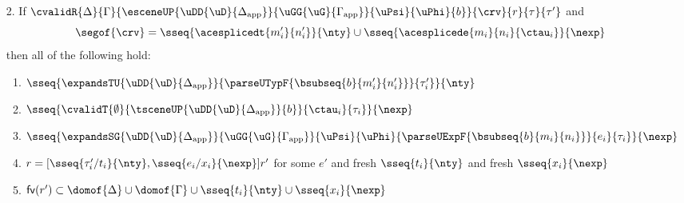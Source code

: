 \begin{lemma}
\begin{grayparbox}
\begin{enumerate}
\item[2.] If $\cvalidR{\Delta}{\Gamma}{\esceneUP{\uDD{\uD}{\Delta_\text{app}}}{\uGG{\uG}{\Gamma_\text{app}}}{\uPsi}{\uPhi}{b}}{\crv}{r}{\tau}{\tau'}$ and \[\segof{\crv} = \sseq{\acesplicedt{m'_i}{n'_i}}{\nty} \cup \sseq{\acesplicede{m_i}{n_i}{\ctau_i}}{\nexp}\] then all of the following hold:
  \begin{enumerate}
    \item $\sseq{
          \expandsTU{\uDD{\uD}{\Delta_\text{app}}}
          {
            \parseUTypF{\bsubseq{b}{m'_i}{n'_i}}
          }{\tau'_i}
        }{\nty}$
    \item $\sseq{
      \cvalidT{\emptyset}{
        \tsceneUP
          {\uDD
            {\uD}{\Delta_\text{app}}
          }{b}
      }{
        \ctau_i
      }{\tau_i}
    }{\nexp}$
    \item $\sseq{
      \expandsSG
        {\uDD{\uD}{\Delta_\text{app}}}
        {\uGG{\uG}{\Gamma_\text{app}}}
        {\uPsi}
        {\uPhi}
        {\parseUExpF{\bsubseq{b}{m_i}{n_i}}}
        {e_i}
        {\tau_i}
    }{\nexp}$
    \item $r = [\sseq{\tau'_i/t_i}{\nty}, \sseq{e_i/x_i}{\nexp}]r'$ for some $e'$ and fresh $\sseq{t_i}{\nty}$ and fresh $\sseq{x_i}{\nexp}$ 
    \item $\mathsf{fv}(r') \subset \domof{\Delta} \cup \domof{\Gamma} \cup \sseq{t_i}{\nty} \cup \sseq{x_i}{\nexp}$
  \end{enumerate}
\end{enumerate}
\end{grayparbox}
\end{lemma}
